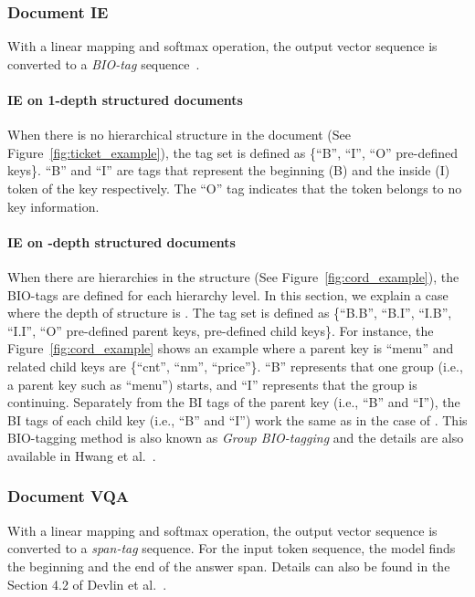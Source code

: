 \documentclass[runningheads]{llncs}
\begin{document}
\subsubsection{Document IE}
With a linear mapping and softmax operation, the output vector sequence is converted to a \textit{BIO-tag} sequence~\cite{hwang2019pot}.

\paragraph{IE on 1-depth structured documents}
When there is no hierarchical structure in the document (See Figure~\ref{fig:ticket_example}), the tag set is defined as \{``B'', ``I'', ``O''   pre-defined keys\}.
``B'' and ``I'' are tags that represent the beginning (B) and the inside (I) token of the key  respectively.
The ``O'' tag indicates that the token belongs to no key information. 

\paragraph{IE on -depth structured documents}
When there are hierarchies in the structure (See Figure~\ref{fig:cord_example}), the BIO-tags are defined for each hierarchy level.
In this section, we explain a case where the depth of structure is .
The tag set is defined as \{``B.B'', ``B.I'', ``I.B'', ``I.I'', ``O''   pre-defined parent keys,  pre-defined child keys\}.
For instance, the Figure~\ref{fig:cord_example} shows an example where a parent key is ``menu'' and related child keys are \{``cnt'', ``nm'', ``price''\}.
``B'' represents that one group (i.e., a parent key such as ``menu'') starts, and ``I'' represents that the group is continuing. 
Separately from the BI tags of the parent key (i.e., ``B'' and ``I''), the BI tags of each child key (i.e., ``B'' and ``I'') work the same as in the case of .
This BIO-tagging method is also known as \textit{Group BIO-tagging} and the details are also available in Hwang et al.~\cite{hwang2019pot}.

\subsubsection{Document VQA}
With a linear mapping and softmax operation, the output vector sequence is converted to a \textit{span-tag} sequence.
For the input token sequence, the model finds the beginning and the end of the answer span.
Details can also be found in the Section 4.2 of Devlin et al.~\cite{devlinBERT2018}.
\end{document}
